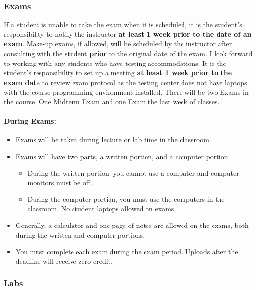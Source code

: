 \documentclass[11pt]{article}
\providecommand{\tightlist}{%
      \setlength{\itemsep}{0pt}\setlength{\parskip}{0pt}}
\begin{document}
    \hypertarget{exams}{%
\subsubsection{Exams}\label{exams}}

If a student is unable to take the exam when it is scheduled, it is the
student's responsibility to notify the instructor \textbf{at least 1
week prior to the date of an exam}. Make-up exams, if allowed, will be
scheduled by the instructor after consulting with the student
\textbf{prior} to the original date of the exam. I look forward to
working with any students who have testing accommodations. It is the
student's responsibility to set up a meeting \textbf{at least 1 week
prior to the exam date} to review exam protocol as the testing center
does not have laptops with the course programming environment installed.
There will be two Exams in the course. One Midterm Exam and one Exam the
last week of classes.

\hypertarget{during-exams}{%
\paragraph{During Exams:}\label{during-exams}}

\begin{itemize}
\tightlist
\item
  Exams will be taken during lecture or lab time in the classroom.
\item
  Exams will have two parts, a written portion, and a computer portion

  \begin{itemize}
  \tightlist
  \item
    During the written portion, you cannot use a computer and computer
    monitors must be off.
  \item
    During the computer portion, you must use the computers in the
    classroom. No student laptops allowed on exams.
  \end{itemize}
\item
  Generally, a calculator and one page of notes are allowed on the
  exams, both during the written and computer portions.
\item
  You must complete each exam during the exam period. Uploads after the
  deadline will receive zero credit.
\end{itemize}

    \hypertarget{labs}{%
\subsubsection{Labs}\label{labs}}
\end{document}

